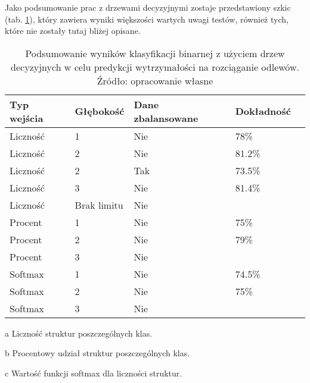 Jako podsumowanie prac z drzewami decyzyjnymi zostaje przedstawiony szkic (tab. \ref{dt.binary.summary.table}), który zawiera wyniki większości wartych uwagi testów, również tych, które nie zostały tutaj bliżej opisane.
\begin{table}[h]
	\centering
	\begin{threeparttable}
		\caption{Podsumowanie wyników klasyfikacji binarnej z użyciem drzew decyzyjnych w celu predykcji wytrzymałości na rozciąganie odlewów. Źródło: opracowanie własne}
		\label{dt.binary.summary.table}
		\begin{tabularx}{1\textwidth}{ |X|X|X|X|X| }
		  \hline
		  \textbf{Typ wejścia} & \textbf{Głębokość} & \textbf{Dane zbalansowane} & \textbf{Dokładność}\\

		  \hline
		  Liczność\tnote{a} & 1 & Nie  & 78\%\\

		  \hline
		   Liczność & 2 & Nie & 81.2\%\\

		  \hline
  		  Liczność & 2 & Tak & 73.5\%\\

		  \hline
		  Liczność & 3 & Nie & 81.4\%\\

		  \hline
		  Liczność & Brak limitu & Nie & \bo{84.3\%} \\

		\Xhline{1.5pt}
  		  Procent\tnote{b} & 1 & Nie & 75\%\\
  		  
		  \hline
  		  Procent & 2 & Nie & 79\%\\
  		  
		  \hline
  		  Procent & 3 & Nie   & \bo{80\%} \\

		\Xhline{1.5pt}
  		  Softmax\tnote{c} & 1 & Nie   & 74.5\%\\

		  \hline
  		  Softmax & 2 & Nie   & 75\% \\

		  \hline
  		  Softmax & 3 & Nie   & \bo{78\%} \\

		  \hline
		\end{tabularx}
		\begin{tablenotes}
			\footnotesize
			\item[a] Liczność struktur poszczególnych klas.
			\item[b] Procentowy udział struktur poszczególnych klas.
			\item[c] Wartość funkcji softmax dla liczności struktur.
		\end{tablenotes}
	\end{threeparttable}
\end{table}
